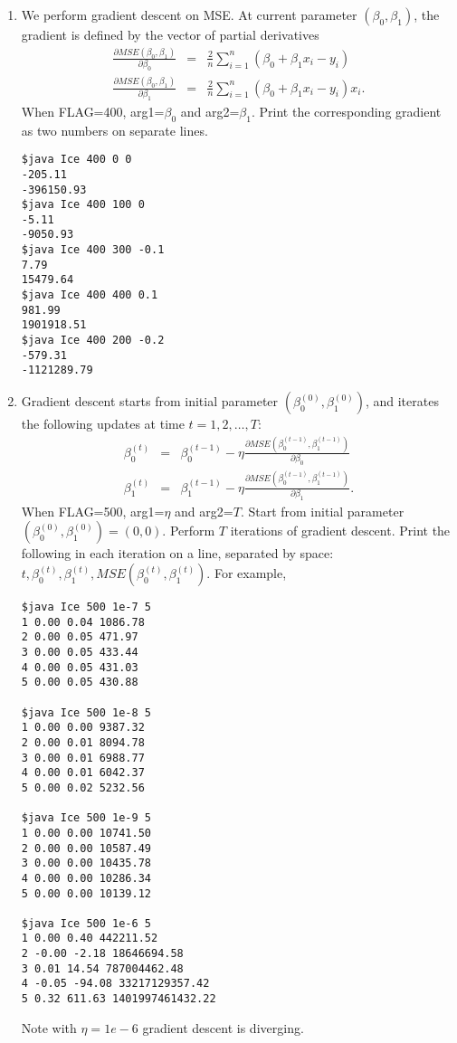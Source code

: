 \documentclass{article}
\begin{document}
\begin{enumerate}
\item
We perform gradient descent on MSE.  
At current parameter $(\beta_0, \beta_1)$, the gradient is defined by the vector of partial derivatives
\begin{eqnarray}
\frac{\partial MSE(\beta_0, \beta_1)}{\partial \beta_0} &=& \frac{2}{n}\sum_{i=1}^n (\beta_0 + \beta_1 x_i - y_i) \\
\frac{\partial MSE(\beta_0, \beta_1)}{\partial \beta_1} &=& \frac{2}{n}\sum_{i=1}^n (\beta_0 + \beta_1 x_i - y_i) x_i.
\end{eqnarray}
When FLAG=400, arg1=$\beta_0$ and arg2=$\beta_1$.
Print the corresponding gradient as two numbers on separate lines.
\begin{verbatim}
$java Ice 400 0 0
-205.11
-396150.93
$java Ice 400 100 0
-5.11
-9050.93
$java Ice 400 300 -0.1
7.79
15479.64
$java Ice 400 400 0.1
981.99
1901918.51
$java Ice 400 200 -0.2
-579.31
-1121289.79
\end{verbatim}

\item
Gradient descent starts from initial parameter $(\beta_0^{(0)}, \beta_1^{(0)})$,
and iterates the following updates at time $t=1,2,\ldots,T$:
\begin{eqnarray}
\beta_0^{(t)} &=& \beta_0^{(t-1)} - \eta \frac{\partial MSE(\beta_0^{(t-1)}, \beta_1^{(t-1)})}{\partial \beta_0} \\
\beta_1^{(t)} &=& \beta_1^{(t-1)} - \eta \frac{\partial MSE(\beta_0^{(t-1)}, \beta_1^{(t-1)})}{\partial \beta_1}.
\end{eqnarray}
When FLAG=500, arg1=$\eta$ and arg2=$T$.
Start from initial parameter $(\beta_0^{(0)}, \beta_1^{(0)})=(0,0)$.
Perform $T$ iterations of gradient descent.
Print the following in each iteration on a line, separated by space:
$t, \beta_0^{(t)}, \beta_1^{(t)}, MSE(\beta_0^{(t)}, \beta_1^{(t)})$.
For example,
\begin{verbatim}
$java Ice 500 1e-7 5
1 0.00 0.04 1086.78
2 0.00 0.05 471.97
3 0.00 0.05 433.44
4 0.00 0.05 431.03
5 0.00 0.05 430.88

$java Ice 500 1e-8 5
1 0.00 0.00 9387.32
2 0.00 0.01 8094.78
3 0.00 0.01 6988.77
4 0.00 0.01 6042.37
5 0.00 0.02 5232.56

$java Ice 500 1e-9 5
1 0.00 0.00 10741.50
2 0.00 0.00 10587.49
3 0.00 0.00 10435.78
4 0.00 0.00 10286.34
5 0.00 0.00 10139.12

$java Ice 500 1e-6 5
1 0.00 0.40 442211.52
2 -0.00 -2.18 18646694.58
3 0.01 14.54 787004462.48
4 -0.05 -94.08 33217129357.42
5 0.32 611.63 1401997461432.22
\end{verbatim}
Note with $\eta=1e-6$ gradient descent is diverging.


\end{enumerate}
\end{document}
